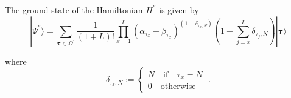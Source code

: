 \documentclass[10pt]{article}
\numberwithin{equation}{section}
\numberwithin{equation}{subsection}
\newcommand{\dt}{\;.}
\begin{document}
The ground state of the Hamiltonian $H^{''}$ is given by 
\begin{equation}\label{ResulsBasis}
	|\Psi^{''} \rangle= \sum_{\bm{\tau}\in \Omega^{'}}\frac{1}{\left(1+L\right)!}\prod_{x=1}^{L} (\alpha_{\tau_{x}}-\beta_{\tau_{x}})^{(1-\delta_{\tau_{x},N})}\left(1+\sum_{j=x}^{L}\delta_{\tau_{j},N}\right) |\bm{\tau}\rangle
\end{equation}

where 
\begin{equation}
    \delta_{\tau_{x},N}:=\begin{cases}
        N\quad \text{if}\quad \tau_{x}=N\\
        0\quad \text{otherwise}
    \end{cases}\dt
\end{equation}
\end{document}
